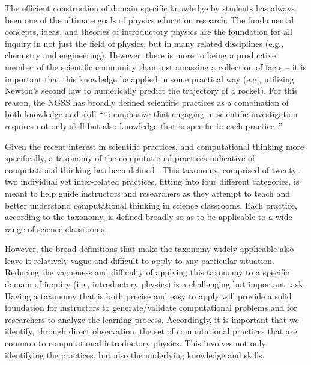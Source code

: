 \documentclass{msuphddissertation}
\begin{document}
\begin{doublespace}
The efficient construction of domain specific knowledge by students has always been one of the ultimate goals of physics education research.  The fundamental concepts, ideas, and theories of introductory physics are the foundation for all inquiry in not just the field of physics, but in many related disciplines (e.g., chemistry and engineering).  However, there is more to being a productive member of the scientific community than just amassing a collection of facts -- it is important that this knowledge be applied in some practical way (e.g., utilizing Newton's second law to numerically predict the trajectory of a rocket).  For this reason, the NGSS has broadly defined scientific practices as a combination of both knowledge and skill ``to emphasize that engaging in scientific investigation requires not only skill but also knowledge that is specific to each practice \cite{NGSS2013}.''  %

Given the recent interest in scientific practices, and computational thinking more specifically, a taxonomy of the computational practices indicative of computational thinking has been defined \cite{Weintrop2015}.  This taxonomy, comprised of twenty-two individual yet inter-related practices, fitting into four different categories, is meant to help guide instructors and researchers as they attempt to teach and better understand computational thinking in science classrooms.  Each practice, according to the taxonomy, is defined broadly so as to be applicable to a wide range of science classrooms.

However, the broad definitions that make the taxonomy widely applicable also leave it relatively vague and difficult to apply to any particular situation.  Reducing the vagueness and difficulty of applying this taxonomy to a specific domain of inquiry (i.e., introductory physics) is a challenging but important task.  Having a taxonomy that is both precise and easy to apply will provide a solid foundation for instructors to generate/validate computational problems and for researchers to analyze the learning process.  Accordingly, it is important that we identify, through direct observation, the set of computational practices that are common to computational introductory physics.  This involves not only identifying the practices, but also the underlying knowledge and skills.


\end{doublespace}
\end{document}

